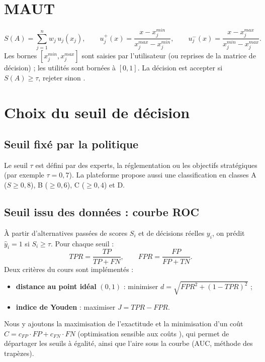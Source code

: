 \documentclass[11pt,a4paper]{report}
\theoremstyle{definition}
\theoremstyle{remark}
\begin{document}
\section{MAUT}
\begin{equation}
  S(A)=\sum_{j=1}^n w_j\,u_j(x_j),\qquad
  u_j^{+}(x)=\frac{x-x_j^{min}}{x_j^{max}-x_j^{min}},\qquad
  u_j^{-}(x)=\frac{x-x_j^{max}}{x_j^{min}-x_j^{max}}.
\end{equation}
Les bornes $[x_j^{min},x_j^{max}]$ sont saisies par l'utilisateur (ou reprises de la matrice de décision) ;
les utilités sont bornées à $[0,1]$. La décision est \og accepter si $S(A)\ge\tau$, rejeter sinon \fg.

\section{Choix du seuil de décision}

\subsection{Seuil fixé par la politique}
Le seuil $\tau$ est défini par des experts, la réglementation ou les objectifs stratégiques (par exemple
$\tau=0{,}7$). La plateforme propose aussi une classification en classes A ($S\ge 0{,}8$), B ($\ge 0{,}6$),
C ($\ge 0{,}4$) et D.

\subsection{Seuil issu des données : courbe ROC}
À partir d'alternatives passées de scores $S_i$ et de décisions réelles $y_i$, on prédit
$\hat y_i=1$ si $S_i\ge\tau$. Pour chaque seuil :
\begin{equation}
  TPR=\frac{TP}{TP+FN},\qquad FPR=\frac{FP}{FP+TN}.
\end{equation}
Deux critères du cours sont implémentés :
\begin{itemize}
  \item \textbf{distance au point idéal} $(0,1)$ : minimiser $d=\sqrt{FPR^2+(1-TPR)^2}$ ;
  \item \textbf{indice de Youden} : maximiser $J=TPR-FPR$.
\end{itemize}
Nous y ajoutons la maximisation de l'exactitude et la minimisation d'un coût
$C=c_{FP}\cdot FP+c_{FN}\cdot FN$ (\og optimisation sensible aux coûts \fg), qui permet de départager les
seuils à égalité, ainsi que l'aire sous la courbe (AUC, méthode des trapèzes).
\end{document}
